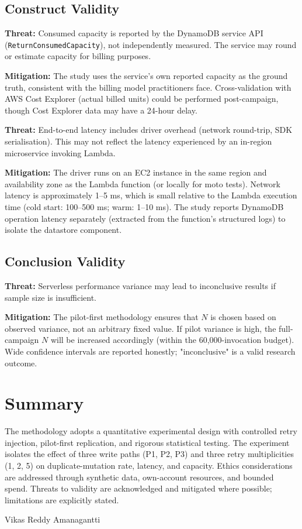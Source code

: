 \subsection{Construct Validity}

\textbf{Threat:} Consumed capacity is reported by the DynamoDB service API (\texttt{ReturnConsumedCapacity}), not independently measured. The service may round or estimate capacity for billing purposes.

\textbf{Mitigation:} The study uses the service's own reported capacity as the ground truth, consistent with the billing model practitioners face. Cross-validation with AWS Cost Explorer (actual billed units) could be performed post-campaign, though Cost Explorer data may have a 24-hour delay.

\textbf{Threat:} End-to-end latency includes driver overhead (network round-trip, SDK serialisation). This may not reflect the latency experienced by an in-region microservice invoking Lambda.

\textbf{Mitigation:} The driver runs on an EC2 instance in the same region and availability zone as the Lambda function (or locally for moto tests). Network latency is approximately 1--5 ms, which is small relative to the Lambda execution time (cold start: 100--500 ms; warm: 1--10 ms). The study reports DynamoDB operation latency separately (extracted from the function's structured logs) to isolate the datastore component.

\subsection{Conclusion Validity}

\textbf{Threat:} Serverless performance variance \citep{Wen2025Variance} may lead to inconclusive results if sample size is insufficient.

\textbf{Mitigation:} The pilot-first methodology ensures that $N$ is chosen based on observed variance, not an arbitrary fixed value. If pilot variance is high, the full-campaign $N$ will be increased accordingly (within the 60,000-invocation budget). Wide confidence intervals are reported honestly; "inconclusive" is a valid research outcome.

\section{Summary}

The methodology adopts a quantitative experimental design with controlled retry injection, pilot-first replication, and rigorous statistical testing. The experiment isolates the effect of three write paths (P1, P2, P3) and three retry multiplicities (1, 2, 5) on duplicate-mutation rate, latency, and capacity. Ethics considerations are addressed through synthetic data, own-account resources, and bounded spend. Threats to validity are acknowledged and mitigated where possible; limitations are explicitly stated.

Vikas Reddy Amanagantti
